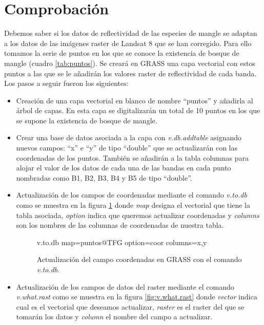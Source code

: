 \section{Comprobación}
Debemos saber si los datos de reflectividad de las especies de mangle se adaptan a los datos de las imágenes raster de Landsat 8 que se han corregido. Para ello tomamos la serie de puntos en los que se conoce la existencia de bosque de mangle (cuadro \ref{tab:puntos}). Se creará en GRASS una capa vectorial con estos puntos a las que se le añadirán los valores raster de reflectividad de cada banda. Los pasos a seguir fueron los siguientes:

\begin{itemize}
	\item Creación de una capa vectorial en blanco de nombre ``puntos'' y añadirla al árbol de capas. En esta capa se digitalizarán un total de 10 puntos en los que se supone la existencia de bosque de mangle.
	\item Crear una base de datos asociada a la capa con \textit{v.db.addtable} asignando nuevos campos: ``x'' e ``y'' de tipo ``double'' que se actualizarán con las coordenadas de los puntos. También se añadirán a la tabla columnas para alojar el valor de los datos de cada una de las bandas en cada punto nombradas como B1, B2, B3, B4 y B5 de tipo ``double''.
	\item Actualización de los campos de coordenadas mediante el comando \textit{v.to.db} como se muestra en la figura \ref{fig:v.to.db} donde \textit{map} designa el vectorial que tiene la tabla asociada, \textit{option} indica que queremos actualizar coordenadas y \textit{columns} son los nombres de las columnas de coordenadas de nuestra tabla.
	
\begin{figure}[ht]
\centering
\begin{boxedverbatim}
	v.to.db map=puntos@TFG option=coor columns=x,y
\end{boxedverbatim}
\caption[Actualización de coordenadas]{Actualización del campo coordenadas en GRASS con el comando \textit{v.to.db}.}
\label{fig:v.to.db}
\end{figure}	
	
	\item Actualización de los campos de datos del raster mediante el comando \textit{v.what.rast} como se muestra en la figura \ref{fig:v.what.rast} donde \textit{vector} indica cual es el vectorial que deseamos actualizar, \textit{raster} es el raster del que se tomarán los datos y \textit{column} el nombre del campo a actualizar.
\end{itemize}


